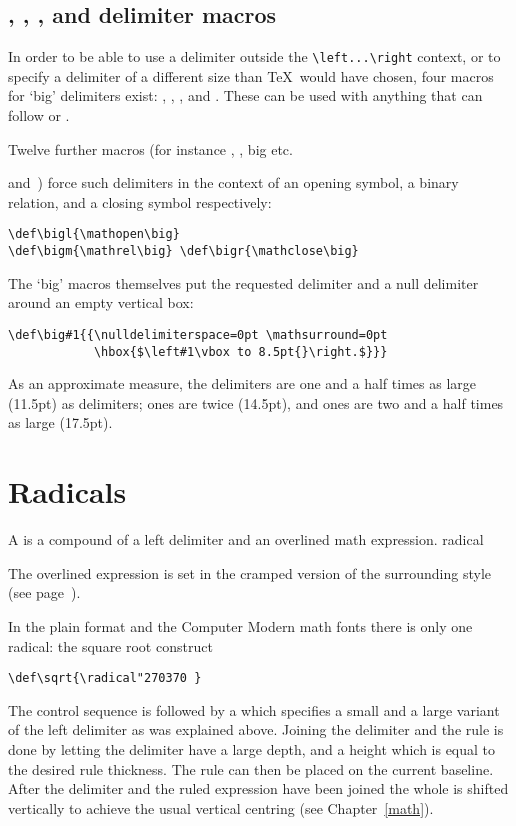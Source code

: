
\subsection{, , , and 
delimiter macros}

In order to be able to use a delimiter outside the 
\verb-\left...\right- context, or to specify a delimiter of
a different size than \TeX\ would have chosen,
four macros for `big' delimiters exist: ,
, , and . These can be used with
anything that can follow  or .

Twelve further macros (for instance , ,
\cstoidx big \rm etc.\par
and~) force such delimiters in the context of
an opening symbol, a binary relation, and a closing symbol
respectively:
\begin{verbatim}
\def\bigl{\mathopen\big}
\def\bigm{\mathrel\big} \def\bigr{\mathclose\big}
\end{verbatim}

The `big' macros themselves put the requested delimiter and
a null delimiter around an empty vertical box:
\begin{verbatim}
\def\big#1{{\nulldelimiterspace=0pt \mathsurround=0pt
            \hbox{$\left#1\vbox to 8.5pt{}\right.$}}}
\end{verbatim}
As an approximate measure,
the  delimiters are one and a half times as large (11.5pt) as
 delimiters;  ones are twice (14.5pt), and 
ones are two and a half times as large (17.5pt).


\section{Radicals}

A  is a compound of a left delimiter and an overlined
math expression.
\cstoidx radical\par
The overlined expression is set in the
cramped version of the surrounding style
\alt
(see page~\pageref{math:styles}).

In the plain format and the Computer Modern
math fonts there is only one radical: the square root
construct
\begin{verbatim}
\def\sqrt{\radical"270370 }
\end{verbatim}
The control sequence  is followed by a 
which specifies a small and a large variant of the left delimiter
as was explained above. Joining the delimiter and the rule
is done by letting the delimiter have a large depth, and a height
which is equal to the desired rule thickness. The rule can then
be placed on the current baseline. After the delimiter and the
ruled expression have been joined the whole is shifted 
vertically to achieve the usual vertical centring 
(see Chapter~\ref{math}).

